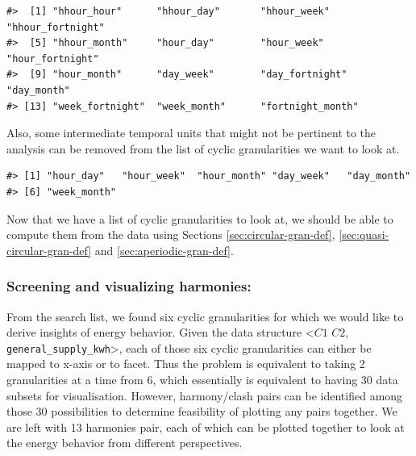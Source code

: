 \documentclass[12pt]{article}
\newenvironment{Shaded}{\begin{snugshade}}{\end{snugshade}}
\newcommand{\DataTypeTok}[1]{\textcolor[rgb]{0.13,0.29,0.53}{#1}}
\newcommand{\KeywordTok}[1]{\textcolor[rgb]{0.13,0.29,0.53}{\textbf{#1}}}
\newcommand{\NormalTok}[1]{#1}
\newcommand{\OperatorTok}[1]{\textcolor[rgb]{0.81,0.36,0.00}{\textbf{#1}}}
\newcommand{\StringTok}[1]{\textcolor[rgb]{0.31,0.60,0.02}{#1}}
\begin{document}
\begin{verbatim}
#>  [1] "hhour_hour"      "hhour_day"       "hhour_week"      "hhour_fortnight"
#>  [5] "hhour_month"     "hour_day"        "hour_week"       "hour_fortnight" 
#>  [9] "hour_month"      "day_week"        "day_fortnight"   "day_month"      
#> [13] "week_fortnight"  "week_month"      "fortnight_month"
\end{verbatim}

Also, some intermediate temporal units that might not be pertinent to the analysis can be removed from the list of cyclic granularities we want to look at.

\begin{Shaded}
\end{Shaded}

\begin{verbatim}
#> [1] "hour_day"   "hour_week"  "hour_month" "day_week"   "day_month" 
#> [6] "week_month"
\end{verbatim}

Now that we have a list of cyclic granularities to look at, we should be able to compute them from the data using Sections \ref{sec:circular-gran-def}, \ref{sec:quasi-circular-gran-def} and \ref{sec:aperiodic-gran-def}.

\hypertarget{screening-and-visualizing-harmonies}{%
\subsubsection{Screening and visualizing harmonies:}\label{screening-and-visualizing-harmonies}}

From the search list, we found six cyclic granularities for which we would like to derive insights of energy behavior. Given the data structure \textless{}\(C1\) \(C2\), \texttt{general\_supply\_kwh}\textgreater{}, each of those six cyclic granularities can either be mapped to x-axis or to facet. Thus the problem is equivalent to taking 2 granularities at a time from 6, which essentially is equivalent to having 30 data subsets for visualisation. However, harmony/clash pairs can be identified among those 30 possibilities to determine feasibility of plotting any pairs together. We are left with 13 harmonies pair, each of which can be plotted together to look at the energy behavior from different perspectives.
\end{document}
